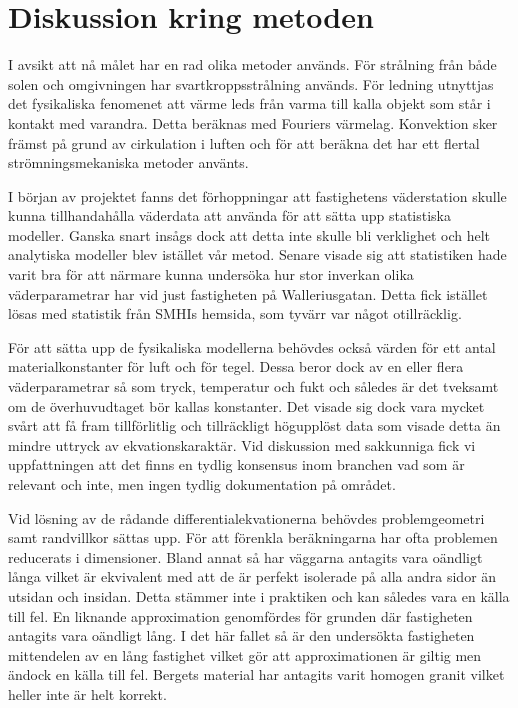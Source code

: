 \section{Diskussion kring metoden}\label{sec:discmethod}

I avsikt att nå målet har en rad olika metoder används. För strålning från både solen och omgivningen har svartkroppsstrålning används. För ledning utnyttjas det fysikaliska fenomenet att värme leds från varma till kalla objekt som står i kontakt med varandra. Detta beräknas med Fouriers värmelag. Konvektion sker främst på grund av cirkulation i luften och för att beräkna det har ett flertal strömningsmekaniska metoder använts.


I början av projektet fanns det förhoppningar att fastighetens väderstation skulle kunna tillhandahålla väderdata att använda för att sätta upp statistiska modeller. 
Ganska snart insågs dock att detta inte skulle bli verklighet och helt analytiska modeller blev istället vår metod. Senare visade sig att statistiken hade varit bra för att närmare kunna undersöka hur stor inverkan olika väderparametrar har vid just fastigheten på Walleriusgatan. 
Detta fick istället lösas med statistik från SMHIs hemsida, som tyvärr var något otillräcklig.

För att sätta upp de fysikaliska modellerna behövdes också värden för ett antal materialkonstanter för luft och för tegel. 
Dessa beror dock av en eller flera väderparametrar så som tryck, temperatur och fukt och således är det tveksamt om de överhuvudtaget bör kallas konstanter. 
Det visade sig dock vara mycket svårt att få fram tillförlitlig och tillräckligt högupplöst data som visade detta än mindre uttryck av ekvationskaraktär.
Vid diskussion med sakkunniga fick vi uppfattningen att det finns en tydlig konsensus inom branchen vad som är relevant och inte, men ingen tydlig dokumentation på området.

Vid lösning av de rådande differentialekvationerna behövdes problemgeometri samt randvillkor sättas upp. För
att förenkla beräkningarna har ofta problemen reducerats i dimensioner. Bland annat så har väggarna antagits vara oändligt
långa vilket är ekvivalent med att de är perfekt isolerade på alla andra sidor än utsidan och insidan. Detta stämmer inte
i praktiken och kan således vara en källa till fel. En liknande approximation genomfördes för grunden där fastigheten
antagits vara oändligt lång. I det här fallet så är den undersökta fastigheten mittendelen av en lång fastighet vilket
gör att approximationen är giltig men ändock en källa till fel. Bergets material har antagits varit homogen granit vilket
heller inte är helt korrekt. 

